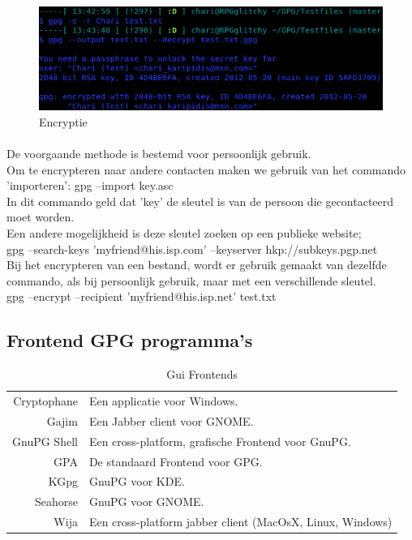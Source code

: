 \documentclass[12pt]{article}
\begin{document}
				\begin{figure}[!ht]
					\begin{center}
						\includegraphics[scale=0.4]{Pictures/Encryptie}
					\end{center}
					\caption{Encryptie}\label{Encryptie}
				\end{figure}
				
				\paragraph{}
				De voorgaande methode is bestemd voor persoonlijk gebruik.\\
				Om te encrypteren naar andere contacten maken we gebruik van het commando 
				'importeren': gpg --import key.asc\\
				In dit commando geld dat 'key' de sleutel is van de persoon die gecontacteerd
				moet worden.\\
				Een andere mogelijkheid is deze sleutel zoeken op een publieke website;\\
				gpg --search-keys 'myfriend@his.isp.com' --keyserver hkp://subkeys.pgp.net\\
				Bij het encrypteren van een bestand, wordt er gebruik gemaakt van dezelfde commando,
				als bij persoonlijk gebruik, maar met een verschillende sleutel.\\
				gpg --encrypt --recipient 'myfriend@his.isp.net' test.txt\\		
			
			\subsection{Frontend GPG programma's}\label{GUI} 
				\begin{table}[!ht]
					\begin{center}
						\begin{tabular}{r|l}
							Cryptophane	&	Een applicatie voor Windows.\\
							Gajim		&	Een Jabber client voor GNOME.\\
							GnuPG Shell	&	Een cross-platform, grafische Frontend voor GnuPG.\\
							GPA			&	De standaard Frontend voor GPG.\\
							KGpg		&	GnuPG voor KDE.\\
							Seahorse	&	GnuPG voor GNOME.\\
							Wija		&	Een cross-platform jabber client (MacOsX, Linux, 														Windows)\\
						\end{tabular}
					\end{center}
					\caption{Gui Frontends}
				\end{table}
			
\end{document}
